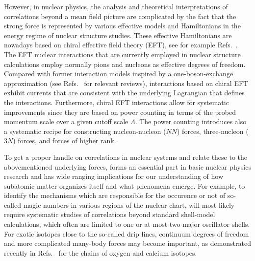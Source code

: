 \documentclass[aps,showpacs,floatfix,nofootinbib,preprintnumbers,superscriptaddress,amsmath,amssymb]{revtex4-1}
\begin{document}
However, in nuclear physics, the analysis and theoretical
interpretations of correlations beyond a mean field picture are
complicated by the fact that the strong force is represented by
various effective models and Hamiltonians in the energy regime of
nuclear structure studies. These effective Hamiltonians are nowadays
based on  chiral effective field theory
(EFT),  see for example
Refs.~\cite{weinberg1990,weinberg1991,ordonez1992,ordonez1994,ordonez1996,vankolck1999,machleidt2011,epelbaum2009,ekstrom2013}.  
The EFT nuclear interactions that are currently
employed in nuclear structure calculations employ normally pions and nucleons
as effective degrees of freedom. Compared
with former interaction models inspired by a one-boson-exchange
approximation (see Refs.~\cite{machleidt1989,machleidt2001} for
relevant reviews), interactions based on chiral EFT exhibit currents
that are consistent with the underlying Lagrangian that defines the
interactions. Furthermore, chiral EFT interactions allow for systematic
improvements since they are based on power counting in terms of the
probed momentum scale over a given cutoff scale $\Lambda$.  The power counting
introduces also a systematic recipe for constructing nucleon-nucleon
($NN$) forces, three-nucleon ($3N$) forces, and forces of higher rank.

To get a proper handle on correlations in nuclear systems and relate
these to the abovementioned underlying forces, forms an essential part
in basic nuclear physics research and has wide ranging implications
for our understanding of how subatomic matter organizes itself and
what phenomena emerge. For example, to identify the mechanisms which
are responsible for the occurence or not of so-called magic numbers in
various regions of the nuclear chart, will most likely require
systematic studies of correlations beyond standard shell-model
calculations, which often are limited to one or at most two major
oscillator shells.  For exotic isotopes close to the so-called drip
lines, continuum degrees of freedom and more complicated many-body
forces may become important, as demonstrated recently in
Refs.~\cite{hagen2012a,hagen2012b} for the chains of oxygen and
calcium isotopes.  
\end{document}
